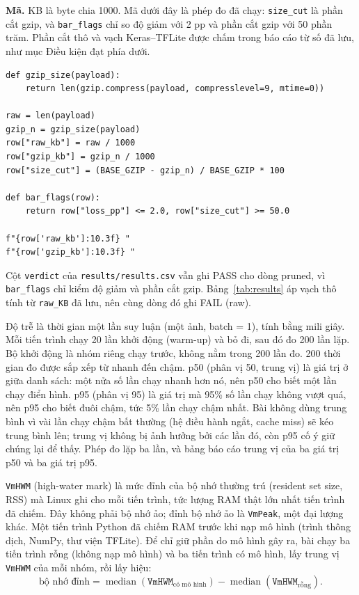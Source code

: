 \documentclass[13pt,a4paper]{article}
\begin{document}
\noindent\textbf{Mã.}
KB là byte chia 1000.
Mã dưới đây là phép đo đã chạy: \texttt{size\_cut} là phần cắt gzip, và \texttt{bar\_flags} chỉ so độ giảm với 2 pp và phần cắt gzip với 50 phần trăm.
Phần cắt thô và vạch Keras–TFLite được chấm trong báo cáo từ số đã lưu, như mục Điều kiện đạt phía dưới.

\nopagebreak
{\fontsize{8}{9.2}\selectfont
\begin{verbatim}
def gzip_size(payload):
    return len(gzip.compress(payload, compresslevel=9, mtime=0))

raw = len(payload)
gzip_n = gzip_size(payload)
row["raw_kb"] = raw / 1000
row["gzip_kb"] = gzip_n / 1000
row["size_cut"] = (BASE_GZIP - gzip_n) / BASE_GZIP * 100

def bar_flags(row):
    return row["loss_pp"] <= 2.0, row["size_cut"] >= 50.0

f"{row['raw_kb']:10.3f} "
f"{row['gzip_kb']:10.3f} "
\end{verbatim}
}

Cột \texttt{verdict} của \texttt{results/results.csv} vẫn ghi PASS cho dòng pruned, vì \texttt{bar\_flags} chỉ kiểm độ giảm và phần cắt gzip.
Bảng~\ref{tab:results} áp vạch thô tính từ \texttt{raw\_KB} đã lưu, nên cùng dòng đó ghi FAIL (raw).

Độ trễ là thời gian một lần suy luận (một ảnh, batch = 1), tính bằng mili giây.
Mỗi tiến trình chạy 20 lần khởi động (warm-up) và bỏ đi, sau đó đo 200 lần lặp.
Bộ khởi động là nhóm riêng chạy trước, không nằm trong 200 lần đo.
200 thời gian đo được sắp xếp từ nhanh đến chậm.
p50 (phân vị 50, trung vị) là giá trị ở giữa danh sách: một nửa số lần chạy nhanh hơn nó,
nên p50 cho biết một lần chạy điển hình.
p95 (phân vị 95) là giá trị mà 95\% số lần chạy không vượt quá,
nên p95 cho biết đuôi chậm, tức 5\% lần chạy chậm nhất.
Bài không dùng trung bình vì vài lần chạy chậm bất thường (hệ điều hành ngắt, cache miss)
sẽ kéo trung bình lên; trung vị không bị ảnh hưởng bởi các lần đó,
còn p95 cố ý giữ chúng lại để thấy.
Phép đo lặp ba lần, và bảng báo cáo trung vị của ba giá trị p50 và ba giá trị p95.


\texttt{VmHWM} (high-water mark) là mức đỉnh của bộ nhớ thường trú
(resident set size, RSS) mà Linux ghi cho mỗi tiến trình,
tức lượng RAM thật lớn nhất tiến trình đã chiếm.
Đây không phải bộ nhớ ảo; đỉnh bộ nhớ ảo là \texttt{VmPeak}, một đại lượng khác.
Một tiến trình Python đã chiếm RAM trước khi nạp mô hình
(trình thông dịch, NumPy, thư viện TFLite).
Để chỉ giữ phần do mô hình gây ra, bài chạy ba tiến trình rỗng (không nạp mô hình)
và ba tiến trình có mô hình, lấy trung vị \texttt{VmHWM} của mỗi nhóm, rồi lấy hiệu:
\[
  \text{bộ nhớ đỉnh} = \operatorname{median}(\texttt{VmHWM}_{\text{có mô hình}})
                     - \operatorname{median}(\texttt{VmHWM}_{\text{rỗng}}).
\]
\end{document}

